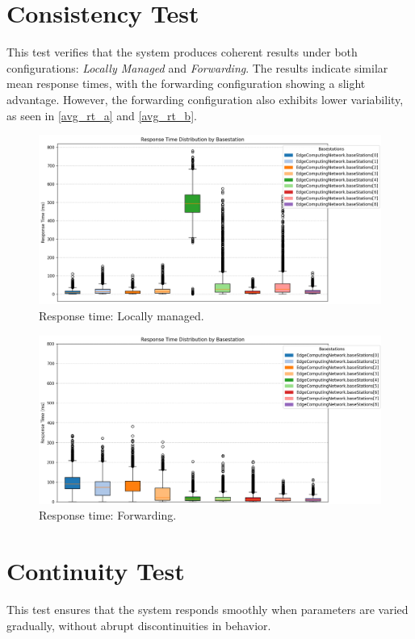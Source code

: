 \documentclass{report}
\begin{document}
\section{Consistency Test}
This test verifies that the system produces coherent results under both configurations: \textit{Locally Managed} and \textit{Forwarding}. 
The results indicate similar mean response times, with the forwarding configuration showing a slight advantage. However, the forwarding configuration also exhibits lower variability, as seen in \autoref{avg_rt_a} and \autoref{avg_rt_b}.

\begin{figure}[H]
    \centering
    \includegraphics[width=1\textwidth]{img/avg_rt_a.png}
    \caption{Response time: Locally managed.}
    \label{avg_rt_a}
\end{figure}

\begin{figure}[H]
    \centering
    \includegraphics[width=1\textwidth]{img/avg_rt_b.png}
    \caption{Response time: Forwarding.}
    \label{avg_rt_b}
\end{figure}

\section{Continuity Test}
This test ensures that the system responds smoothly when parameters are varied gradually, without abrupt discontinuities in behavior.
\end{document}
